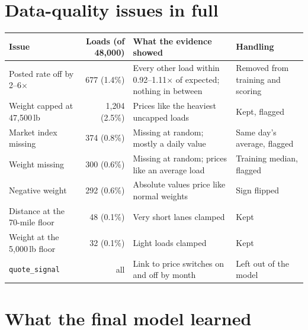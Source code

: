 \documentclass[10pt,twocolumn,letterpaper]{article}
\begin{document}
\onecolumn
\raggedbottom
\appendix
{}

\section{Data-quality issues in full}\label{app:data}

\begin{center}
\small
\begin{tabularx}{\textwidth}{@{}l r X l@{}}
  \toprule
  Issue & Loads (of 48,000) & What the evidence showed & Handling \\
  \midrule
  Posted rate off by 2--6$\times$ & 677 (1.4\%) & Every other load within 0.92--1.11$\times$ of expected; nothing in between & Removed from training and scoring \\
  Weight capped at 47,500\,lb & 1,204 (2.5\%) & Prices like the heaviest uncapped loads & Kept, flagged \\
  Market index missing & 374 (0.8\%) & Missing at random; mostly a daily value & Same day's average, flagged \\
  Weight missing & 300 (0.6\%) & Missing at random; prices like an average load & Training median, flagged \\
  Negative weight & 292 (0.6\%) & Absolute values price like normal weights & Sign flipped \\
  Distance at the 70-mile floor & 48 (0.1\%) & Very short lanes clamped & Kept \\
  Weight at the 5,000\,lb floor & 32 (0.1\%) & Light loads clamped & Kept \\
  \texttt{quote\_signal} & all & Link to price switches on and off by month & Left out of the model \\
  \bottomrule
\end{tabularx}
\end{center}

\section{What the final model learned}\label{app:learned}
\end{document}
